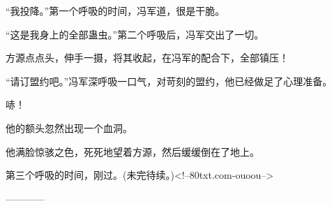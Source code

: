 \begin{this_body}
“我投降。”第一个呼吸的时间，冯军道，很是干脆。

“这是我身上的全部蛊虫。”第二个呼吸后，冯军交出了一切。

方源点点头，伸手一摄，将其收起，在冯军的配合下，全部镇压！

“请订盟约吧。”冯军深呼吸一口气，对苛刻的盟约，他已经做足了心理准备。

哧！

他的额头忽然出现一个血洞。

他满脸惊骇之色，死死地望着方源，然后缓缓倒在了地上。

第三个呼吸的时间，刚过。(未完待续。)<!--80txt.com-ouoou-->

------------

\end{this_body}

